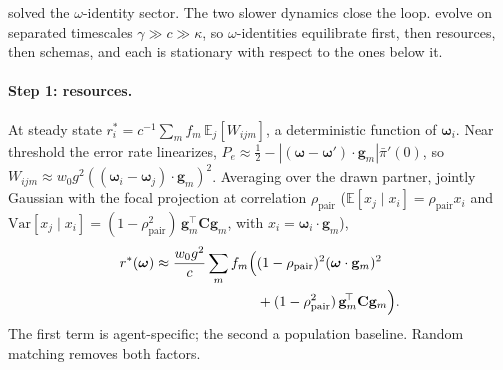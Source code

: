 \documentclass[
  aps,prx,
  reprint,
  superscriptaddress,
  nofootinbib,
  longbibliography
]{revtex4-2}
\newcommand{\w}{\bm{\omega}}
\newcommand{\g}{\mathbf{g}}
\newcommand{\C}{\mathbf{C}}
\newcommand{\rhopair}{\rho_{\mathrm{pair}}}
\newcommand{\pibar}{\bar\pi}
\newcommand{\gain}{g}
\begin{document}
\noindent {} solved the $\omega$-identity sector. The two slower dynamics close the loop.  evolve on separated timescales $\gamma\gg c\gg\kappa$, so $\omega$-identities equilibrate first, then resources, then schemas, and each is stationary with respect to the ones below it.

\paragraph{Step 1: resources.} At steady state $r_i^*=c^{-1}\sum_m f_m\,\mathbb{E}_{j}[W_{ijm}]$, a deterministic function of $\w_i$. Near threshold the error rate linearizes, $P_e\approx\tfrac12-|(\w-\w')\cdot\g_m|\pibar'(0)$, so $W_{ijm}\approx w_0\gain^2((\w_i-\w_j)\cdot\g_m)^2$. Averaging over the drawn partner, jointly Gaussian with the focal projection at correlation $\rhopair$ ($\mathbb{E}[x_j\mid x_i]=\rhopair x_i$ and $\mathrm{Var}[x_j\mid x_i]=(1-\rhopair^2)\,\g_m^{\!\top}\C\g_m$, with $x_i=\w_i\cdot\g_m$),
\begin{equation}\label{eq:rstar}
\begin{split}
r^*(\w)\approx\frac{w_0\gain^2}{c}\sum_m f_m\Bigl(&(1-\rhopair)^2(\w\cdot\g_m)^2\\
&+(1-\rhopair^2)\,\g_m^{\!\top}\C\g_m\Bigr).
\end{split}
\end{equation}
The first term is agent-specific; the second a population baseline. Random matching removes both factors.
\end{document}
